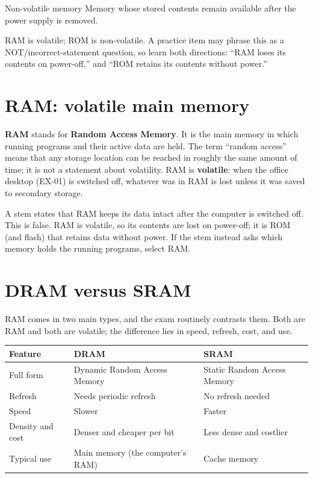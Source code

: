 \begin{definitionbox}{Non-volatile memory}
Memory whose stored contents remain available after the power supply is
removed.
\end{definitionbox}

RAM is volatile; ROM is non-volatile. A practice item may phrase this as a
NOT/incorrect-statement question, so learn both directions: ``RAM loses its
contents on power-off,'' and ``ROM retains its contents without power.''

\section{RAM: volatile main memory}
\textbf{RAM} stands for \textbf{Random Access Memory}. It is the main memory
in which running programs and their active data are held. The term ``random
access'' means that any storage location can be reached in roughly the same
amount of time; it is not a statement about volatility. RAM is
\textbf{volatile}: when the office desktop (EX-01) is switched off, whatever
was in RAM is lost unless it was saved to secondary storage.

\begin{example}
A stem states that RAM keeps its data intact after the computer is switched
off. This is false. RAM is volatile, so its contents are lost on power-off;
it is ROM (and flash) that retains data without power. If the stem instead
asks which memory holds the running programs, select RAM.
\end{example}

\section{DRAM versus SRAM}
RAM comes in two main types, and the exam routinely contrasts them. Both are
RAM and both are volatile; the difference lies in speed, refresh, cost, and
use.

\begin{center}
\begin{tabular}{p{}p{}p{}}
\toprule
\textbf{Feature} & \textbf{DRAM} & \textbf{SRAM}\\
\midrule
Full form & Dynamic Random Access Memory & Static Random Access Memory\\
Refresh & Needs periodic refresh & No refresh needed\\
Speed & Slower & Faster\\
Density and cost & Denser and cheaper per bit & Less dense and costlier\\
Typical use & Main memory (the computer's RAM) & Cache memory\\
\bottomrule
\end{tabular}
\end{center}

